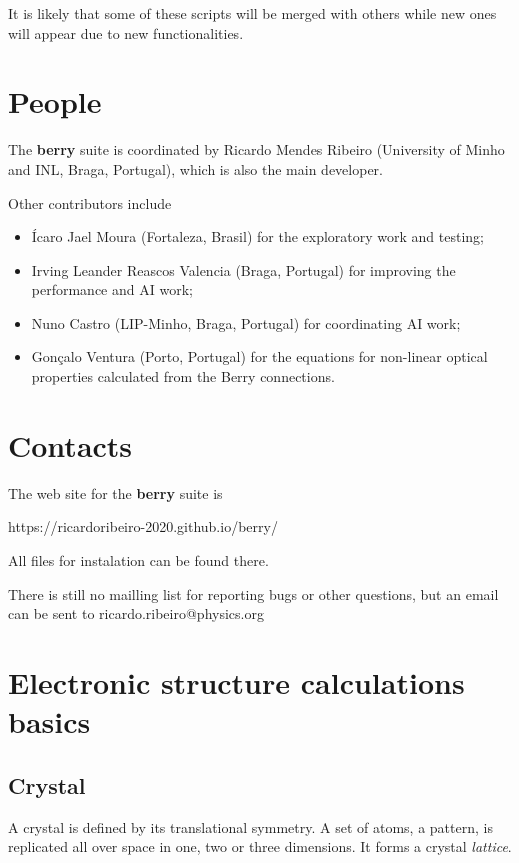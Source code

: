 \documentclass[a4paper,12pt]{report}
\begin{document}
It is likely that some of these scripts will be merged with others while new ones will appear due to new functionalities.







\section{People}

The \textbf{berry} suite is coordinated by Ricardo Mendes Ribeiro (University of Minho and INL, Braga, Portugal),
which is also the main developer.\medskip

Other contributors include
\begin{itemize}
 \item Ícaro Jael Moura (Fortaleza, Brasil) for the exploratory work and testing;
 \item Irving Leander Reascos Valencia (Braga, Portugal) for improving the performance and AI work;
 \item Nuno Castro (LIP-Minho, Braga, Portugal) for coordinating AI work;
 \item Gonçalo Ventura (Porto, Portugal) for the equations for non-linear optical properties calculated from the Berry connections.
\end{itemize}


\section{Contacts}

The web site for the \textbf{berry} suite is\medskip

https://ricardoribeiro-2020.github.io/berry/\medskip

All files for instalation can be found there.

There is still no mailling list for reporting bugs or other questions, but an email can be sent to
ricardo.ribeiro@physics.org


\section{Electronic structure calculations basics}

\subsection*{Crystal}
A crystal is defined by its translational symmetry.
A set of atoms, a pattern, is replicated all over space in one, two or three dimensions.
It forms a crystal \emph{lattice}.
\end{document}
